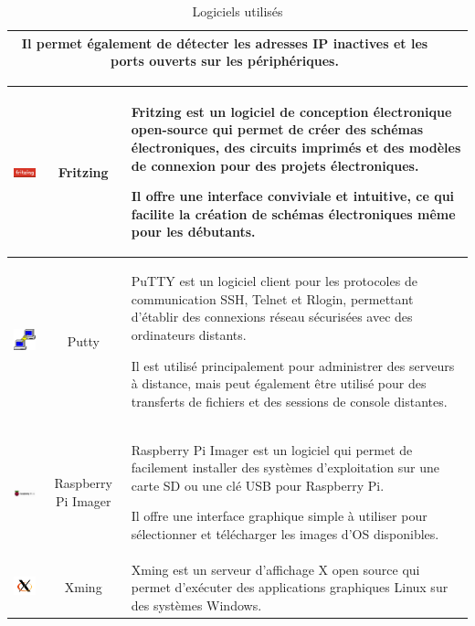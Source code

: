 \begin{table}[H]
\begin{tabular}{|c{3cm}|c{3cm}|l{10cm}|}
Il permet également de détecter les adresses IP inactives et les ports ouverts sur les périphériques.  \\
\hline
\end{tabular}
\caption{Logiciels utilisés}
\label{2}
\end{table}


\begin{table}[H]
\begin{center}
\begin{tabular}{|c{3cm}|c{3cm}|l{10cm}|}
\hline
\includegraphics[width=3cm]{Images/Logo-Fritzing.png} & Fritzing & Fritzing est un logiciel de conception électronique open-source qui permet de créer des schémas électroniques, des circuits imprimés et des modèles de connexion pour des projets électroniques. 

Il offre une interface conviviale et intuitive, ce qui facilite la création de schémas électroniques même pour les débutants. \\
\hline
\includegraphics[width=3cm]{Images/Logo-Putty.png} & Putty & PuTTY est un logiciel client pour les protocoles de communication SSH, Telnet et Rlogin, permettant d'établir des connexions réseau sécurisées avec des ordinateurs distants. 

Il est utilisé principalement pour administrer des serveurs à distance, mais peut également être utilisé pour des transferts de fichiers et des sessions de console distantes. \\
\hline
\includegraphics[width=3cm]{Images/Logo-Raspberry.png} & Raspberry Pi Imager & Raspberry Pi Imager est un logiciel qui permet de facilement installer des systèmes d'exploitation sur une carte SD ou une clé USB pour Raspberry Pi. 

Il offre une interface graphique simple à utiliser pour sélectionner et télécharger les images d'OS disponibles. \\
\hline
\includegraphics[width=3cm]{Images/xminglogo.png} & Xming & Xming est un serveur d'affichage X open source qui permet d'exécuter des applications graphiques Linux sur des systèmes Windows. 


\end{tabular}
\end{center}
\end{table}
